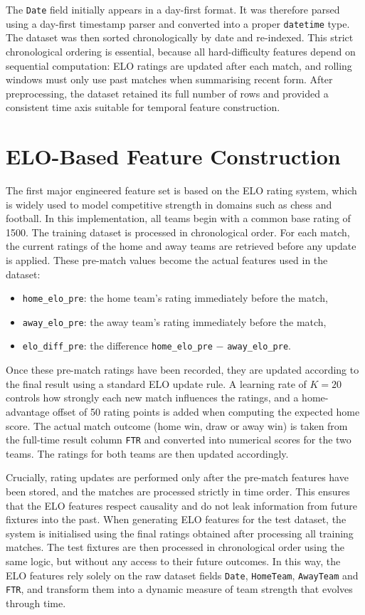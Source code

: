 \documentclass[11pt,a4paper]{article}
\begin{document}
The \texttt{Date} field initially appears in a day-first format. It was therefore parsed using a day-first timestamp parser and converted into a proper \texttt{datetime} type. The dataset was then sorted chronologically by date and re-indexed. This strict chronological ordering is essential, because all hard-difficulty features depend on sequential computation: ELO ratings are updated after each match, and rolling windows must only use past matches when summarising recent form. After preprocessing, the dataset retained its full number of rows and provided a consistent time axis suitable for temporal feature construction.

\section{ELO-Based Feature Construction}

The first major engineered feature set is based on the ELO rating system, which is widely used to model competitive strength in domains such as chess and football. In this implementation, all teams begin with a common base rating of 1500. The training dataset is processed in chronological order. For each match, the current ratings of the home and away teams are retrieved before any update is applied. These pre-match values become the actual features used in the dataset:
\begin{itemize}
    \item \texttt{home\_elo\_pre}: the home team’s rating immediately before the match,
    \item \texttt{away\_elo\_pre}: the away team’s rating immediately before the match,
    \item \texttt{elo\_diff\_pre}: the difference \texttt{home\_elo\_pre} $-$ \texttt{away\_elo\_pre}.
\end{itemize}

Once these pre-match ratings have been recorded, they are updated according to the final result using a standard ELO update rule. A learning rate of $K = 20$ controls how strongly each new match influences the ratings, and a home-advantage offset of 50 rating points is added when computing the expected home score. The actual match outcome (home win, draw or away win) is taken from the full-time result column \texttt{FTR} and converted into numerical scores for the two teams. The ratings for both teams are then updated accordingly.

Crucially, rating updates are performed only after the pre-match features have been stored, and the matches are processed strictly in time order. This ensures that the ELO features respect causality and do not leak information from future fixtures into the past. When generating ELO features for the test dataset, the system is initialised using the final ratings obtained after processing all training matches. The test fixtures are then processed in chronological order using the same logic, but without any access to their future outcomes. In this way, the ELO features rely solely on the raw dataset fields \texttt{Date}, \texttt{HomeTeam}, \texttt{AwayTeam} and \texttt{FTR}, and transform them into a dynamic measure of team strength that evolves through time.
\end{document}
